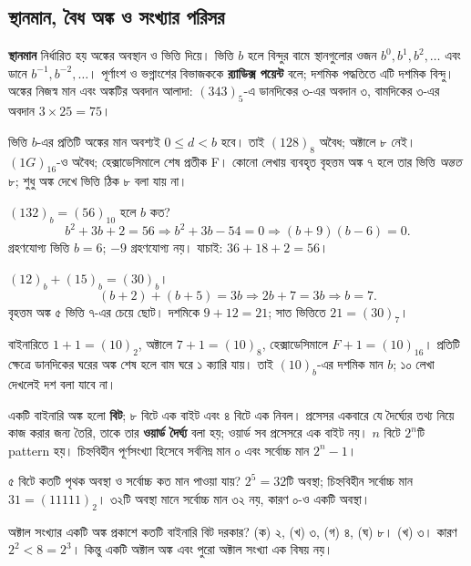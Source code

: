 \subsection{স্থানমান, বৈধ অঙ্ক ও সংখ্যার পরিসর}
\textbf{স্থানমান} নির্ধারিত হয় অঙ্কের অবস্থান ও ভিত্তি দিয়ে। ভিত্তি $b$ হলে বিন্দুর বামে স্থানগুলোর ওজন $b^0,b^1,b^2,\ldots$ এবং ডানে $b^{-1},b^{-2},\ldots$। পূর্ণাংশ ও ভগ্নাংশের বিভাজককে \textbf{র‍্যাডিক্স পয়েন্ট} বলে; দশমিক পদ্ধতিতে এটি দশমিক বিন্দু। অঙ্কের নিজস্ব মান এবং অঙ্কটির অবদান আলাদা: $(343)_5$-এ ডানদিকের ৩-এর অবদান ৩, বামদিকের ৩-এর অবদান $3\times25=75$।

ভিত্তি $b$-এর প্রতিটি অঙ্কের মান অবশ্যই $0\leq d<b$ হবে। তাই $(128)_8$ অবৈধ; অক্টালে ৮ নেই। $(1G)_{16}$-ও অবৈধ; হেক্সাডেসিমালে শেষ প্রতীক F। কোনো লেখায় ব্যবহৃত বৃহত্তম অঙ্ক ৭ হলে তার ভিত্তি \emph{অন্তত} ৮; শুধু অঙ্ক দেখে ভিত্তি ঠিক ৮ বলা যায় না।

$(132)_b=(56)_{10}$ হলে $b$ কত?
\chThreeAnswer
\[b^2+3b+2=56\Rightarrow b^2+3b-54=0\Rightarrow(b+9)(b-6)=0.\]
গ্রহণযোগ্য ভিত্তি $b=6$; $-9$ গ্রহণযোগ্য নয়। যাচাই: $36+18+2=56$।

$(12)_b+(15)_b=(30)_b$।
\chThreeAnswer
\[(b+2)+(b+5)=3b\Rightarrow2b+7=3b\Rightarrow b=7.\]
বৃহত্তম অঙ্ক ৫ ভিত্তি ৭-এর চেয়ে ছোট। দশমিকে $9+12=21$; সাত ভিত্তিতে $21=(30)_7$।

বাইনারিতে $1+1=(10)_2$, অক্টালে $7+1=(10)_8$, হেক্সাডেসিমালে $F+1=(10)_{16}$। প্রতিটি ক্ষেত্রে ডানদিকের ঘরের অঙ্ক শেষ হলে বাম ঘরে ১ ক্যারি যায়। তাই $(10)_b$-এর দশমিক মান $b$; ১০ লেখা দেখলেই দশ বলা যাবে না।

একটি বাইনারি অঙ্ক হলো \textbf{বিট}; ৮ বিটে এক বাইট এবং ৪ বিটে এক নিবল। প্রসেসর একবারে যে দৈর্ঘ্যের তথ্য নিয়ে কাজ করার জন্য তৈরি, তাকে তার \textbf{ওয়ার্ড দৈর্ঘ্য} বলা হয়; ওয়ার্ড সব প্রসেসরে এক বাইট নয়। $n$ বিটে $2^n$টি pattern হয়। চিহ্নবিহীন পূর্ণসংখ্যা হিসেবে সর্বনিম্ন মান ০ এবং সর্বোচ্চ মান $2^n-1$।

৫ বিটে কতটি পৃথক অবস্থা ও সর্বোচ্চ কত মান পাওয়া যায়?
\chThreeAnswer $2^5=32$টি অবস্থা; চিহ্নবিহীন সর্বোচ্চ মান $31=(11111)_2$। ৩২টি অবস্থা মানে সর্বোচ্চ মান ৩২ নয়, কারণ ০-ও একটি অবস্থা।

অক্টাল সংখ্যার একটি অঙ্ক প্রকাশে কতটি বাইনারি বিট দরকার? (ক) ২, (খ) ৩, (গ) ৪, (ঘ) ৮।
\chThreeAnswer (খ) ৩। কারণ $2^2<8=2^3$। কিন্তু একটি অক্টাল অঙ্ক এবং পুরো অক্টাল সংখ্যা এক বিষয় নয়।

